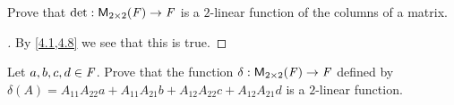 \setcounter{ex}{12}
\begin{ex}\label{ex:4.5.13}
  Prove that \(\det : \mathsf{M}_{{2} \times 2}({\mathit{F}}) \to \mathit{F}\) is a \(2\)-linear function of the columns of a matrix.
\end{ex}

\begin{proof}[]
  By \cref{4.1,4.8} we see that this is true.
\end{proof}

\begin{ex}\label{ex:4.5.14}
  Let \(a, b, c, d \in \mathit{F}\).
  Prove that the function \(\delta : \mathsf{M}_{{2} \times 2}({\mathit{F}}) \to \mathit{F}\) defined by \(\delta(A) = A_{1 1} A_{2 2} a + A_{1 1} A_{2 1} b + A_{1 2} A_{2 2} c + A_{1 2} A_{2 1} d\) is a \(2\)-linear function.
\end{ex}

